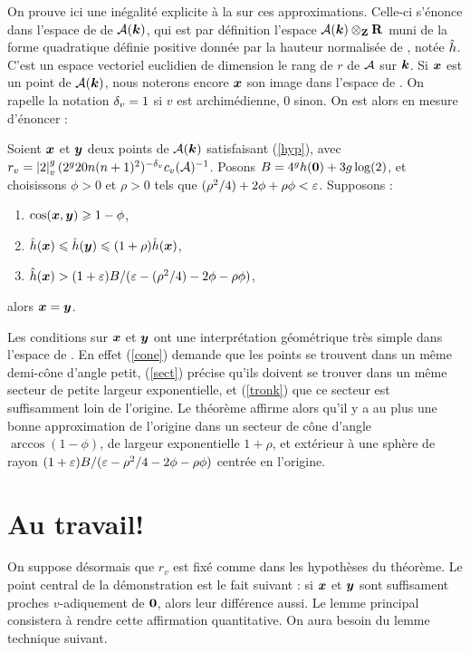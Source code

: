 On prouve ici une inégalité explicite à la  sur ces approximations. Celle-ci s'énonce dans l'espace de  de $\mathcal{A}(\boldsymbol{k})$, qui est par définition l'espace $\mathcal{A}(\boldsymbol{k})\otimes_{\mathbf{Z}} \mathbf{R}$ muni de la forme quadratique définie positive donnée par la hauteur normalisée de , notée $\hat{h}$. C'est un espace vectoriel euclidien de dimension le rang de  $r$ de $\mathcal{A}$ sur $\boldsymbol{k}$. Si ${\boldsymbol{x}}$ est un point de $\mathcal{A}(\boldsymbol{k})$, nous noterons encore ${\boldsymbol{x}}$ son image dans l'espace de . On rapelle la notation ${\delta_v} = 1$ si $v$ est archimédienne, $0$ sinon. On est alors en mesure d'énoncer :

\begin{thm} \label{mumpt}
Soient ${\boldsymbol{x}}$ et ${\boldsymbol{y}}$ deux points de $\mathcal{A}(\boldsymbol{k})$ satisfaisant (\ref{hyp}), avec $r_v = \left\lvert2\right\rvert_{v}^g(2^g20n(n+1)^2)^{-{\delta_v}} c_v(\mathcal{A})^{-1}$. Posons $B = 4^gh({\boldsymbol{0}})+ 3g\log(2)$, et choisissons $\phi > 0$ et $\rho > 0$ tels que $(\rho^2/4) + 2\phi + \rho\phi< \varepsilon$. Supposons :
\begin{enumerate}
\item $\cos({\boldsymbol{x}},{\boldsymbol{y}}) \geqslant 1-\phi$, \label{cone}
\item $\hat{h}({\boldsymbol{x}}) \leqslant \hat{h}({\boldsymbol{y}}) \leqslant (1+\rho)\hat{h}({\boldsymbol{x}})$, \label{sect}
\item $\hat{h}({\boldsymbol{x}}) > (1+\varepsilon)B/(\varepsilon - (\rho^2/4) - 2\phi - \rho\phi)$, \label{tronk}
\end{enumerate}
alors ${\boldsymbol{x}} = {\boldsymbol{y}}$.
\end{thm}

Les conditions sur ${\boldsymbol{x}}$ et ${\boldsymbol{y}}$ ont une interprétation géométrique très simple dans l'espace de . En effet (\ref{cone}) demande que les points se trouvent dans un même demi-cône d'angle petit, (\ref{sect}) précise qu'ils doivent se trouver dans un même secteur de petite largeur exponentielle, et (\ref{tronk}) que ce secteur est suffisamment loin de l'origine. Le théorème affirme alors qu'il y a au plus une bonne approximation de l'origine dans un secteur de cône d'angle $\arccos(1-\phi)$, de largeur exponentielle $1+\rho$, et extérieur à une sphère de rayon $(1+\varepsilon)B/(\varepsilon - \rho^2/4 - 2\phi - \rho\phi )$ centrée en l'origine.

\section{Au travail!}

On suppose désormais que $r_v$ est fixé comme dans les hypothèses du théorème. Le point central de la démonstration est le fait suivant : si ${\boldsymbol{x}}$ et ${\boldsymbol{y}}$ sont suffisament proches $v$-adiquement de ${\boldsymbol{0}}$, alors leur différence aussi. Le lemme principal consistera à rendre cette affirmation quantitative. On aura besoin du lemme technique suivant.

